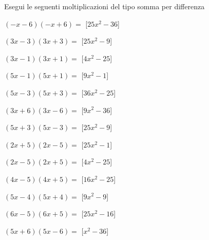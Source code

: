 \begin{esercizio}
 \label{ese:11.17}
Esegui le seguenti moltiplicazioni del tipo somma per differenza
 \begin{multicols}{2}
\begin{enumeratea}
\spazielenx
\item \(\left(- x - 6\right)\left(- x + 6\right)=\)
  \hfill [\(25 x^{2} - 36\)]
\item \(\left(3 x - 3\right)\left(3 x + 3\right)=\)
  \hfill [\(25 x^{2} - 9\)]
\item \(\left(3 x - 1\right)\left(3 x + 1\right)=\)
  \hfill [\(4 x^{2} - 25\)]
\item \(\left(5 x - 1\right)\left(5 x + 1\right)=\)
  \hfill [\(9 x^{2} - 1\)]
\item \(\left(5 x - 3\right)\left(5 x + 3\right)=\)
  \hfill [\(36 x^{2} - 25\)]
\item \(\left(3 x + 6\right)\left(3 x - 6\right)=\)
  \hfill [\(9 x^{2} - 36\)]
\item \(\left(5 x + 3\right)\left(5 x - 3\right)=\)
  \hfill [\(25 x^{2} - 9\)]
\item \(\left(2 x + 5\right)\left(2 x - 5\right)=\)
  \hfill [\(25 x^{2} - 1\)]
\item \(\left(2 x - 5\right)\left(2 x + 5\right)=\)
  \hfill [\(4 x^{2} - 25\)]
\item \(\left(4 x - 5\right)\left(4 x + 5\right)=\)
  \hfill [\(16 x^{2} - 25\)]
\item \(\left(5 x - 4\right)\left(5 x + 4\right)=\)
  \hfill [\(9 x^{2} - 9\)]
\item \(\left(6 x - 5\right)\left(6 x + 5\right)=\)
  \hfill [\(25 x^{2} - 16\)]
\item \(\left(5 x + 6\right)\left(5 x - 6\right)=\)
  \hfill [\(x^{2} - 36\)]

\end{enumeratea}
\end{multicols}
\end{esercizio}

